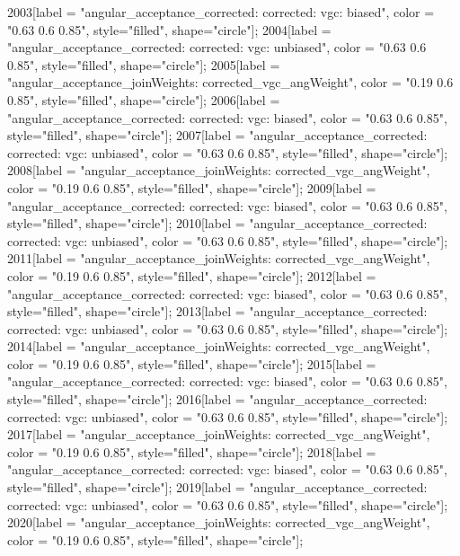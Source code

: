 {	2003[label = "angular_acceptance_corrected\nangacc: corrected\ncsp: vgc\ntrigger: biased", color = "0.63 0.6 0.85", style="filled", shape="circle"];
	2004[label = "angular_acceptance_corrected\nangacc: corrected\ncsp: vgc\ntrigger: unbiased", color = "0.63 0.6 0.85", style="filled", shape="circle"];
	2005[label = "angular_acceptance_joinWeights\nwflag: corrected_vgc_angWeight", color = "0.19 0.6 0.85", style="filled", shape="circle"];
	2006[label = "angular_acceptance_corrected\nangacc: corrected\ncsp: vgc\ntrigger: biased", color = "0.63 0.6 0.85", style="filled", shape="circle"];
	2007[label = "angular_acceptance_corrected\nangacc: corrected\ncsp: vgc\ntrigger: unbiased", color = "0.63 0.6 0.85", style="filled", shape="circle"];
	2008[label = "angular_acceptance_joinWeights\nwflag: corrected_vgc_angWeight", color = "0.19 0.6 0.85", style="filled", shape="circle"];
	2009[label = "angular_acceptance_corrected\nangacc: corrected\ncsp: vgc\ntrigger: biased", color = "0.63 0.6 0.85", style="filled", shape="circle"];
	2010[label = "angular_acceptance_corrected\nangacc: corrected\ncsp: vgc\ntrigger: unbiased", color = "0.63 0.6 0.85", style="filled", shape="circle"];
	2011[label = "angular_acceptance_joinWeights\nwflag: corrected_vgc_angWeight", color = "0.19 0.6 0.85", style="filled", shape="circle"];
	2012[label = "angular_acceptance_corrected\nangacc: corrected\ncsp: vgc\ntrigger: biased", color = "0.63 0.6 0.85", style="filled", shape="circle"];
	2013[label = "angular_acceptance_corrected\nangacc: corrected\ncsp: vgc\ntrigger: unbiased", color = "0.63 0.6 0.85", style="filled", shape="circle"];
	2014[label = "angular_acceptance_joinWeights\nwflag: corrected_vgc_angWeight", color = "0.19 0.6 0.85", style="filled", shape="circle"];
	2015[label = "angular_acceptance_corrected\nangacc: corrected\ncsp: vgc\ntrigger: biased", color = "0.63 0.6 0.85", style="filled", shape="circle"];
	2016[label = "angular_acceptance_corrected\nangacc: corrected\ncsp: vgc\ntrigger: unbiased", color = "0.63 0.6 0.85", style="filled", shape="circle"];
	2017[label = "angular_acceptance_joinWeights\nwflag: corrected_vgc_angWeight", color = "0.19 0.6 0.85", style="filled", shape="circle"];
	2018[label = "angular_acceptance_corrected\nangacc: corrected\ncsp: vgc\ntrigger: biased", color = "0.63 0.6 0.85", style="filled", shape="circle"];
	2019[label = "angular_acceptance_corrected\nangacc: corrected\ncsp: vgc\ntrigger: unbiased", color = "0.63 0.6 0.85", style="filled", shape="circle"];
	2020[label = "angular_acceptance_joinWeights\nwflag: corrected_vgc_angWeight", color = "0.19 0.6 0.85", style="filled", shape="circle"];
}
